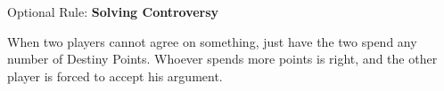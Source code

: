 \begin{multicols}{2}
\begin{boco}
Optional Rule: \textbf{Solving Controversy}\pc%

When two players cannot agree on something, just have the two spend any number of Destiny Points. Whoever spends more points is right, and the other player is forced to accept his argument.
\end{boco}
\end{multicols}

\begin{center}
\end{center}
\clearpage